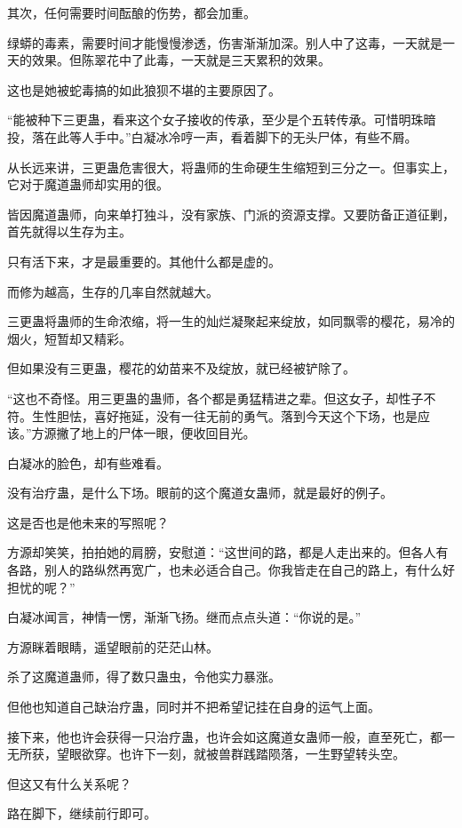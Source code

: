 \begin{this_body}
其次，任何需要时间酝酿的伤势，都会加重。

绿蟒的毒素，需要时间才能慢慢渗透，伤害渐渐加深。别人中了这毒，一天就是一天的效果。但陈翠花中了此毒，一天就是三天累积的效果。

这也是她被蛇毒搞的如此狼狈不堪的主要原因了。

“能被种下三更蛊，看来这个女子接收的传承，至少是个五转传承。可惜明珠暗投，落在此等人手中。”白凝冰冷哼一声，看着脚下的无头尸体，有些不屑。

从长远来讲，三更蛊危害很大，将蛊师的生命硬生生缩短到三分之一。但事实上，它对于魔道蛊师却实用的很。

皆因魔道蛊师，向来单打独斗，没有家族、门派的资源支撑。又要防备正道征剿，首先就得以生存为主。

只有活下来，才是最重要的。其他什么都是虚的。

而修为越高，生存的几率自然就越大。

三更蛊将蛊师的生命浓缩，将一生的灿烂凝聚起来绽放，如同飘零的樱花，易冷的烟火，短暂却又精彩。

但如果没有三更蛊，樱花的幼苗来不及绽放，就已经被铲除了。

“这也不奇怪。用三更蛊的蛊师，各个都是勇猛精进之辈。但这女子，却性子不符。生性胆怯，喜好拖延，没有一往无前的勇气。落到今天这个下场，也是应该。”方源撇了地上的尸体一眼，便收回目光。

白凝冰的脸色，却有些难看。

没有治疗蛊，是什么下场。眼前的这个魔道女蛊师，就是最好的例子。

这是否也是他未来的写照呢？

方源却笑笑，拍拍她的肩膀，安慰道：“这世间的路，都是人走出来的。但各人有各路，别人的路纵然再宽广，也未必适合自己。你我皆走在自己的路上，有什么好担忧的呢？”

白凝冰闻言，神情一愣，渐渐飞扬。继而点点头道：“你说的是。”

方源眯着眼睛，遥望眼前的茫茫山林。

杀了这魔道蛊师，得了数只蛊虫，令他实力暴涨。

但他也知道自己缺治疗蛊，同时并不把希望记挂在自身的运气上面。

接下来，他也许会获得一只治疗蛊，也许会如这魔道女蛊师一般，直至死亡，都一无所获，望眼欲穿。也许下一刻，就被兽群践踏陨落，一生野望转头空。

但这又有什么关系呢？

路在脚下，继续前行即可。

\end{this_body}

